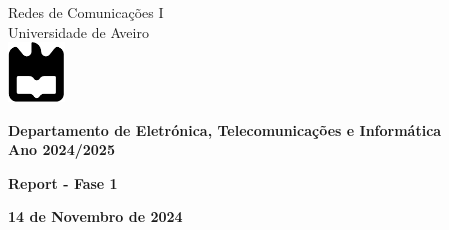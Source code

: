 \documentclass{article}
\begin{document}
%
\def\titulo{Bobinas de Helmholtz}
\def\autores{Fábio Franco, João Marques, Ricardo Domingues}
\def\empresa{Universidade de Aveiro}
\def\logotipo{ua.pdf}
%
%
\begin{titlepage}
    \centering
    {\LARGE {Redes de Comunicações I}}\\
    \vspace{0.5cm}
    {\LARGE Universidade de Aveiro}\\
    \vspace{1.5cm}
    \includegraphics[width=1.5cm]{images/ua.pdf} %
    \vspace{1.5cm}
    
    {\Large \textbf{Departamento de Eletrónica, Telecomunicações e Informática}}\\
    \vspace{0.5cm}
    {\large \textbf{Ano 2024/2025}}\\
    
    \vfill
    
    {\Large \textbf{Report - Fase 1}}\\
    \vspace{0.5cm}
    
    \vfill
    
    \vspace{2cm}
    \begin{center}
      \large \textbf{14 de Novembro de 2024}
    \end{center}
    \vspace{0.1cm}
    \begin{center}
    \end{center}
    
\end{titlepage}


\end{document}

